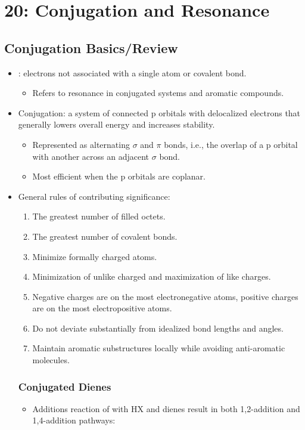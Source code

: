 \chapter{20: Conjugation and Resonance}\label{20: Conjugation and Resonance}
\section{Conjugation Basics/Review}\label{}
\begin{itemize}
  \item {}: electrons not associated with a single atom or covalent bond.
    \begin{itemize}
      \item Refers to resonance in conjugated systems and aromatic compounds.
    \end{itemize}
  \item Conjugation: a system of connected p orbitals with delocalized electrons that generally lowers overall energy and increases stability.
    \begin{itemize}
      \item Represented as alternating \(\sigma \) and \(\pi \) bonds, i.e., the overlap of a p orbital with another across an adjacent \(\sigma \) bond.
      \item Most efficient when the p orbitals are coplanar.
    \end{itemize}
  \item General rules of contributing significance:
    \begin{enumerate}
      \item The greatest number of filled octets.
      \item The greatest number of covalent bonds.
      \item Minimize formally charged atoms.
      \item Minimization of unlike charged and maximization of like charges.
      \item Negative charges are on the most electronegative atoms, positive charges are on the most electropositive atoms.
      \item Do not deviate substantially from idealized bond lengths and angles.
      \item Maintain aromatic substructures locally while avoiding anti-aromatic molecules.
    \end{enumerate}


  \subsection{Conjugated Dienes}\label{Conjugated Dienes}
  \begin{itemize}
    \item Additions reaction of with HX and dienes result in both 1,2-addition and 1,4-addition pathways:
    

\end{itemize}
\end{itemize}
